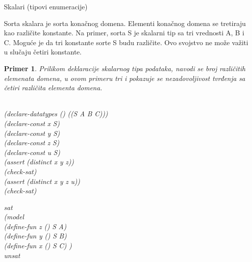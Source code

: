 \documentclass[12pt,oneside]{memoir}
\newtheorem{primer}{Primer}
\begin{document}
Skalari (tipovi enumeracije)

Sorta skalara je sorta konačnog domena. Elementi konačnog domena se tretiraju kao različite konstante. Na primer, sorta S je skalarni tip sa tri vrednosti A, B i C. Moguće je da tri konstante sorte S budu različite. Ovo svojstvo ne može važiti u slučaju četiri konstante.
\\ 
\begin{primer} Prilikom deklaracije skalarnog tipa podataka, navodi se broj različitih elemenata domena, u ovom primeru tri i pokazuje se nezadovoljivost tvrđenja sa četiri različita elementa domena. \\ \\
\begin{minipage}[b]{0.5\textwidth}
(declare-datatypes () ((S A B C)))
\\(declare-const x S)
\\(declare-const y S)
\\(declare-const z S)
\\(declare-const u S)
\\(assert (distinct x y z))
\\(check-sat)
\\(assert (distinct x y z u))
\\(check-sat)
\end{minipage}
\hspace{1cm} 
\begin{minipage}[t]{0.5\textwidth}
\vspace{-5.3cm}
sat 
\\(model 
\\(define-fun z () S A) 
\\(define-fun y () S B) 
\\(define-fun x () S C) ) 
\\unsat
\end{minipage}
\end{primer}
\end{document}
